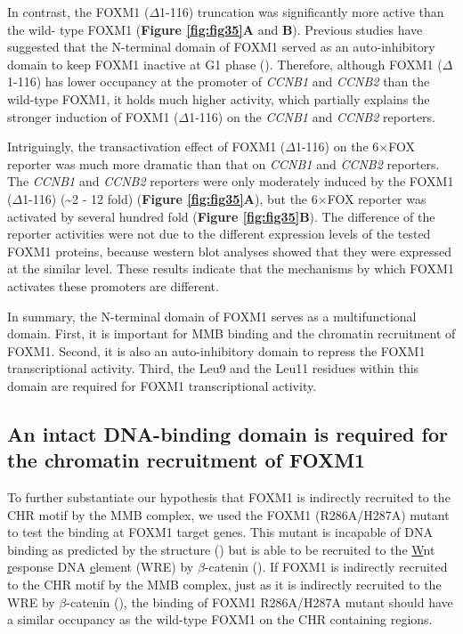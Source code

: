 In contrast, the FOXM1 ($\Delta$1-116) truncation was significantly more active than the wild- type FOXM1 (\textbf{Figure \ref{fig:fig35}A} and \textbf{B}). Previous studies have suggested that the N-terminal domain of FOXM1 served as an auto-inhibitory domain to keep FOXM1 inactive at G1 phase (\cite{laoukili2008activation,park2008an}). Therefore, although FOXM1 ($\Delta$1-116) has lower occupancy at the promoter of \textit{CCNB1} and \textit{CCNB2} than the wild-type FOXM1, it holds much higher activity, which partially explains the stronger induction of FOXM1 ($\Delta$1-116) on the \textit{CCNB1} and \textit{CCNB2} reporters.

Intriguingly, the transactivation effect of FOXM1 ($\Delta$1-116) on the 6$\times$FOX reporter was much more dramatic than that on \textit{CCNB1} and \textit{CCNB2} reporters. The \textit{CCNB1} and \textit{CCNB2} reporters were only moderately induced by the FOXM1 ($\Delta$1-116) (\textasciitilde 2 - 12 fold) (\textbf{Figure \ref{fig:fig35}A}), but the 6$\times$FOX reporter was activated by several hundred fold (\textbf{Figure \ref{fig:fig35}B}). The difference of the reporter activities were not due to the different expression levels of the tested FOXM1 proteins, because western blot analyses showed that they were expressed at the similar level. These results indicate that the mechanisms by which FOXM1 activates these promoters are different.

In summary, the N-terminal domain of FOXM1 serves as a multifunctional domain. First, it is important for MMB binding and the chromatin recruitment of FOXM1. Second, it is also an auto-inhibitory domain to repress the FOXM1 transcriptional activity. Third, the Leu9 and the Leu11 residues within this domain are required for FOXM1 transcriptional activity.

\subsection{An intact DNA-binding domain is required for the chromatin recruitment of FOXM1}

To further substantiate our hypothesis that FOXM1 is indirectly recruited to the CHR motif by the MMB complex, we used the FOXM1 (R286A/H287A) mutant to test the binding at FOXM1 target genes. This mutant is incapable of DNA binding as predicted by the structure (\cite{littler2010structure}) but is able to be recruited to the \underline{W}nt \underline{r}esponse DNA \underline{e}lement (WRE) by $\beta$-catenin (\cite{zhang2011foxm1}). If FOXM1 is indirectly recruited to the CHR motif by the MMB complex, just as it is indirectly recruited to the WRE by $\beta$-catenin (\cite{zhang2011foxm1}), the binding of FOXM1 R286A/H287A mutant should have a similar occupancy as the wild-type FOXM1 on the CHR containing regions.

